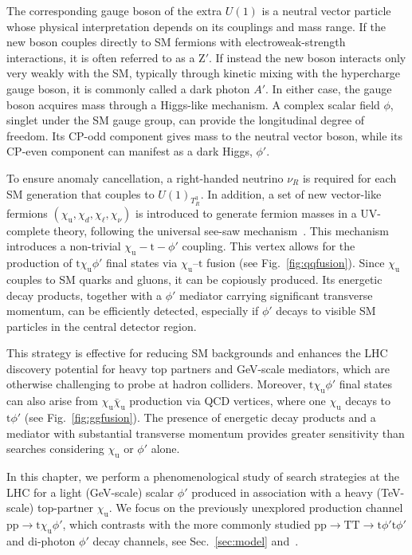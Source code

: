 The corresponding gauge boson of the extra $U(1)$ is a neutral vector particle whose physical interpretation depends on its couplings and mass range.  If the new boson couples directly to SM fermions with electroweak-strength interactions, it is often referred to as a $\textrm{Z}'$.  If instead the new boson interacts only very weakly with the SM, typically through kinetic mixing with the hypercharge gauge boson, it is commonly called a dark photon $A'$.  In either case, the gauge boson acquires mass through a Higgs-like mechanism. A complex scalar field $\phi$, singlet under the SM gauge group, can provide the longitudinal degree of freedom. Its CP-odd component gives mass to the neutral vector boson, while its CP-even component can manifest as a dark Higgs, $\phi'$.

To ensure anomaly cancellation, a right-handed neutrino $\nu_R$ is required for each SM generation that couples to $U(1)_{T^3_R}$. In addition, a set of new vector-like fermions $(\chi_\mathrm{u}, \chi_d, \chi_\ell, \chi_\nu)$ is introduced to generate fermion masses in a UV-complete theory, following the universal see-saw mechanism~\parencite{Berezhiani, Chang1987, Davidson1987, Rajpoot1987, Babu1989, Babu1990}. This mechanism introduces a non-trivial $\chi_\mathrm{u} - \mathrm{t} -\phi'$ coupling. This vertex allows for the production of $\mathrm{t}\chi_\mathrm{u} \phi'$ final states via $\chi_\mathrm{u}$--$\mathrm{t}$ fusion (see Fig.~\ref{fig:qqfusion}). Since $\chi_\mathrm{u}$ couples to SM quarks and gluons, it can be copiously produced. Its energetic decay products, together with a $\phi'$ mediator carrying significant transverse momentum, can be efficiently detected, especially if $\phi'$ decays to visible SM particles in the central detector region.

This strategy is effective for reducing SM backgrounds and enhances the LHC discovery potential for heavy top partners and GeV-scale mediators, which are otherwise challenging to probe at hadron colliders. Moreover, $\mathrm{t}\chi_\mathrm{u} \phi'$ final states can also arise from $\chi_\mathrm{u}\bar\chi_\mathrm{u}$ production via QCD vertices, where one $\chi_\mathrm{u}$ decays to $\mathrm{t}\phi'$ (see Fig.~\ref{fig:ggfusion}). The presence of energetic decay products and a mediator with substantial transverse momentum provides greater sensitivity than searches considering $\chi_\mathrm{u}$ or $\phi'$ alone.

In this chapter, we perform a phenomenological study of search strategies at the LHC for a light (GeV-scale) scalar $\phi'$ produced in association with a heavy (TeV-scale) top-partner $\chi_\mathrm{u}$. We focus on the previously unexplored production channel $\mathrm{pp}\to \mathrm{t}\chi_\mathrm{u} \phi'$, which contrasts with the more commonly studied $\mathrm{pp}\to \mathrm{T}\mathrm{T}\to \mathrm{t}\phi'\mathrm{t}\phi'$ and di-photon $\phi'$ decay channels, see Sec.~\ref{sec:model} and~\parencite{Bhardwaj_2022, Bhardwaj_2022_2, Bardhan_2023, Banerjee_2016, Alves_2024}.

